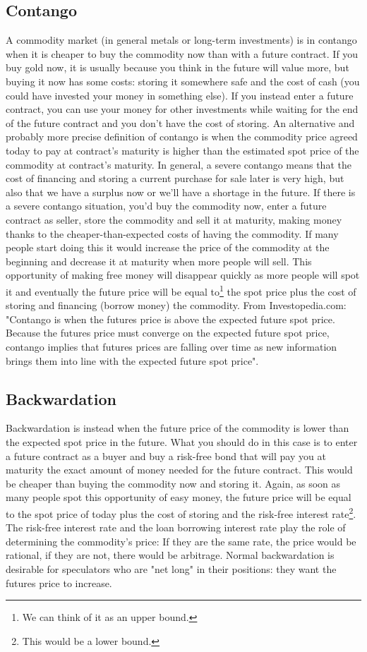 \subsection{Contango}
A commodity market (in general metals or long-term investments) is in contango when it is cheaper to buy the commodity now than with a future contract. If you buy gold now, it is usually because you think in the future will value more, but buying it now has some costs: storing it somewhere safe and the cost of cash (you could have invested your money in something else). If you instead enter a future contract, you can use your money for other investments while waiting for the end of the future contract and you don't have the cost of storing.
An alternative and probably more precise definition of contango is when the commodity price agreed today to pay at contract's maturity is higher than the estimated spot price of the commodity at contract's maturity. In general, a severe contango means that the cost of financing and storing a current purchase for sale later is very high, but also that we have a surplus now or we'll have a shortage in the future.
If there is a severe contango situation, you'd buy the commodity now, enter a future contract as seller, store the commodity and sell it at maturity, making money thanks to the cheaper-than-expected costs of having the commodity. If many people start doing this it would increase the price of the commodity at the beginning and decrease it at maturity when more people will sell. This opportunity of making free money will disappear quickly as more people will spot it and eventually the future price will be equal to\footnote{We can think of it as an upper bound.} the spot price plus the cost of storing and financing (borrow money) the commodity.
From Investopedia.com: "Contango is when the futures price is above the expected future spot price. Because the futures price must converge on the expected future spot price, contango implies that futures prices are falling over time as new information brings them into line with the expected future spot price".

\subsection{Backwardation}
Backwardation is instead when the future price of the commodity is lower than the expected spot price in the future. What you should do in this case is to enter a future contract as a buyer and buy a risk-free bond that will pay you at maturity the exact amount of money needed for the future contract. This would be cheaper than buying the commodity now and storing it. Again, as soon as many people spot this opportunity of easy money, the future price will be equal to the spot price of today plus the cost of storing and the risk-free interest rate\footnote{This would be a lower bound.}. The risk-free interest rate and the loan borrowing interest rate play the role of determining the commodity's price: If they are the same rate, the price would be rational, if they are not, there would be arbitrage.
Normal backwardation is desirable for speculators who are "net long" in their positions: they want the futures price to increase.

